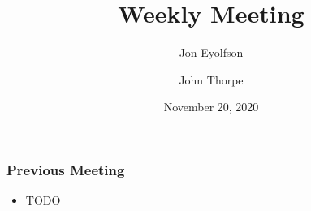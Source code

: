 

\title{Weekly Meeting}
\date{November 20, 2020}
\author{Jon Eyolfson \and John Thorpe}



  \begin{frame}[plain]
    \titlepage
  \end{frame}

  \setcounter{framenumber}{0}

  \begin{frame}
    \frametitle{Previous Meeting}

    \begin{itemize}
      \item TODO
    \end{itemize}
  \end{frame}


